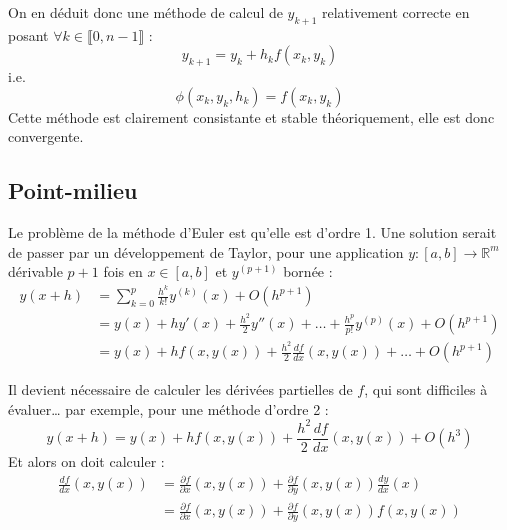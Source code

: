 \documentclass[a4paper, titlepage]{livret} %
\begin{document}
				On en déduit donc une méthode de calcul de $y_{k+1}$ relativement correcte en posant $\forall k \in \llbracket 0, n-1 \rrbracket$ :
				\[
					y_{k+1} = y_{k} + h_{k}f(x_{k}, y_{k}) 
				\]
				i.e.
				\[
					\phi(x_{k}, y_{k}, h_{k}) = f(x_{k}, y_{k}) 
				\]
				Cette méthode est clairement consistante et stable théoriquement, elle est donc convergente.

			\subsection{Point-milieu}
				Le problème de la méthode d'Euler est qu'elle est d'ordre 1.
				Une solution serait de passer par un développement de Taylor, pour une application $y : [a,b] \to \mathbb{R}^{m}$ dérivable $p + 1$ fois en $x \in [a,b]$ et $y^{(p + 1)}$ bornée :
				\[
				\begin{aligned}
					y(x + h) & = \sum_{k = 0}^{p} \frac{h^{k}}{k!} y^{(k)}(x) + O(h^{p + 1}) \\
							 & = y(x) + hy'(x) + \frac{h^{2}}{2}y''(x) + … + \frac{h^{p}}{p!} y^{(p)}(x) + O(h^{p + 1}) \\
							 & = y(x) + hf(x, y(x)) + \frac{h^{2}}{2}\frac{df}{dx}(x,y(x)) + … + O(h^{p + 1})
				\end{aligned}
				\]

				Il devient nécessaire de calculer les dérivées partielles de $f$, qui sont difficiles à évaluer… par exemple, pour une méthode d'ordre 2 :
				\[
					y(x + h)  = y(x) + hf(x,y(x)) + \frac{h^{2}}{2}\frac{df}{dx}(x,y(x)) + O(h^{3})
				\]
				Et alors on doit calculer :
				\[
				\begin{aligned}
					\frac{df}{dx}(x,y(x)) & = \frac{\partial f}{\partial x}(x,y(x)) + \frac{\partial f}{\partial y}(x,y(x))\frac{dy}{dx}(x) \\
										  & = \frac{\partial f}{\partial x}(x,y(x)) + \frac{\partial f}{\partial y}(x,y(x)) f(x,y(x))
				\end{aligned}
				\]
\end{document}
